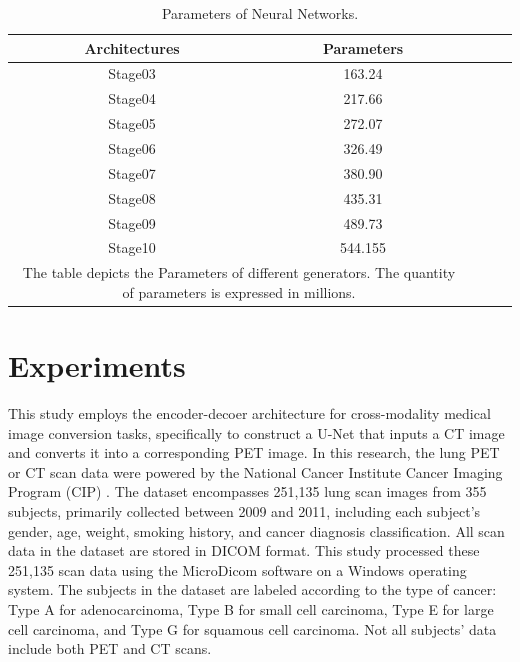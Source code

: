 \documentclass[twocolumn]{article}
\begin{document}
\begin{table}[h]
	\centering
	\caption{Parameters of Neural Networks.}
	\label{tab:model_parameters}
	\begin{tabular}{ccccc}
		\hline
		Architectures & Parameters \\
		\hline
		Stage03       & 163.24     \\
		Stage04       & 217.66     \\
		Stage05       & 272.07     \\
		Stage06       & 326.49     \\
		Stage07       & 380.90     \\
		Stage08       & 435.31     \\
		Stage09       & 489.73     \\
		Stage10       & 544.155    \\
		\hline
		\multicolumn{2}{p{201pt}}{The table depicts the Parameters of different generators. The quantity of parameters is expressed in millions.}
	\end{tabular}
\end{table}


\section{Experiments}
This study employs the encoder-decoer architecture for cross-modality medical image conversion tasks, specifically to construct a U-Net that inputs a CT image and converts it into a corresponding PET image. In this research, the lung PET or CT scan data were powered by the National Cancer Institute Cancer Imaging Program (CIP) \cite{li_large-scale_2020}.  The dataset encompasses 251,135 lung scan images from 355 subjects, primarily collected between 2009 and 2011, including each subject's gender, age, weight, smoking history, and cancer diagnosis classification. All scan data in the dataset are stored in DICOM format. This study processed these 251,135 scan data using the MicroDicom software on a Windows operating system. The subjects in the dataset are labeled according to the type of cancer: Type A for adenocarcinoma, Type B for small cell carcinoma, Type E for large cell carcinoma, and Type G for squamous cell carcinoma. Not all subjects' data include both PET and CT scans. 
\end{document}
